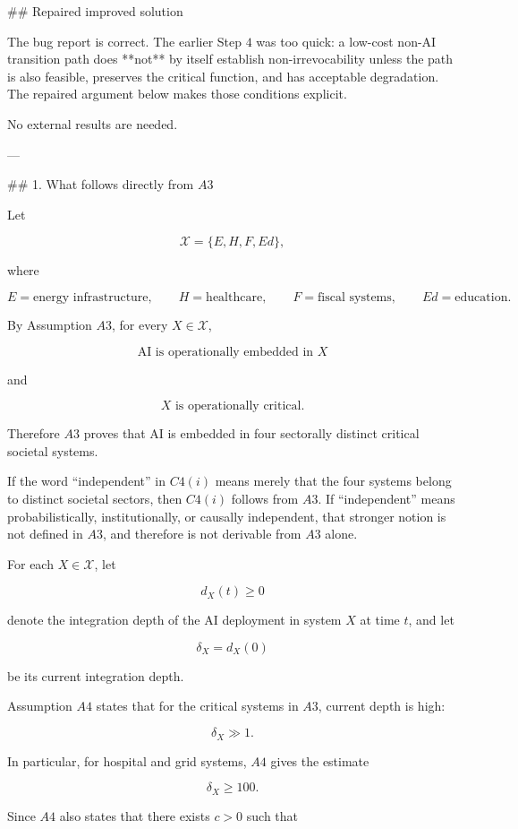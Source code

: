 ## Repaired improved solution

The bug report is correct. The earlier Step \(4\) was too quick: a low-cost non-AI transition path does **not** by itself establish non-irrevocability unless the path is also feasible, preserves the critical function, and has acceptable degradation. The repaired argument below makes those conditions explicit.

No external results are needed.

---

## 1. What follows directly from \(A3\)

Let

\[
\mathcal X=\{E,H,F,Ed\},
\]

where

\[
E=\text{energy infrastructure},\qquad
H=\text{healthcare},\qquad
F=\text{fiscal systems},\qquad
Ed=\text{education}.
\]

By Assumption \(A3\), for every \(X\in\mathcal X\),

\[
\text{AI is operationally embedded in }X
\]

and

\[
X\text{ is operationally critical}.
\]

Therefore \(A3\) proves that AI is embedded in four sectorally distinct critical societal systems.

If the word “independent” in \(C4(i)\) means merely that the four systems belong to distinct societal sectors, then \(C4(i)\) follows from \(A3\). If “independent” means probabilistically, institutionally, or causally independent, that stronger notion is not defined in \(A3\), and therefore is not derivable from \(A3\) alone.

For each \(X\in\mathcal X\), let

\[
d_X(t)\ge 0
\]

denote the integration depth of the AI deployment in system \(X\) at time \(t\), and let

\[
\delta_X=d_X(0)
\]

be its current integration depth.

Assumption \(A4\) states that for the critical systems in \(A3\), current depth is high:

\[
\delta_X\gg 1.
\]

In particular, for hospital and grid systems, \(A4\) gives the estimate

\[
\delta_X\ge 100.
\]

Since \(A4\) also states that there exists \(c>0\) such that

